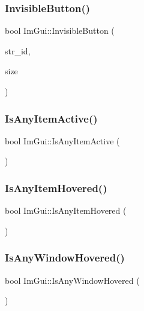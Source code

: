 \subsubsection{\texorpdfstring{Invisible\+Button()}{InvisibleButton()}}
{\footnotesize\ttfamily bool Im\+Gui\+::\+Invisible\+Button (\begin{DoxyParamCaption}\item[{const char $\ast$}]{str\+\_\+id,  }\item[{const \hyperlink{struct_im_vec2}{Im\+Vec2} \&}]{size }\end{DoxyParamCaption})}

\hypertarget{namespace_im_gui_acdc18199d50d26919312db5f9707b8dc}{}\label{namespace_im_gui_acdc18199d50d26919312db5f9707b8dc} 
\subsubsection{\texorpdfstring{Is\+Any\+Item\+Active()}{IsAnyItemActive()}}
{\footnotesize\ttfamily bool Im\+Gui\+::\+Is\+Any\+Item\+Active (\begin{DoxyParamCaption}{ }\end{DoxyParamCaption})}

\hypertarget{namespace_im_gui_a0512146617bb55e24ebcfbe3ce6553d5}{}\label{namespace_im_gui_a0512146617bb55e24ebcfbe3ce6553d5} 
\subsubsection{\texorpdfstring{Is\+Any\+Item\+Hovered()}{IsAnyItemHovered()}}
{\footnotesize\ttfamily bool Im\+Gui\+::\+Is\+Any\+Item\+Hovered (\begin{DoxyParamCaption}{ }\end{DoxyParamCaption})}

\hypertarget{namespace_im_gui_a62379e94283e247288c9a6c15a2b797e}{}\label{namespace_im_gui_a62379e94283e247288c9a6c15a2b797e} 
\subsubsection{\texorpdfstring{Is\+Any\+Window\+Hovered()}{IsAnyWindowHovered()}}
{\footnotesize\ttfamily bool Im\+Gui\+::\+Is\+Any\+Window\+Hovered (\begin{DoxyParamCaption}{ }\end{DoxyParamCaption})}

